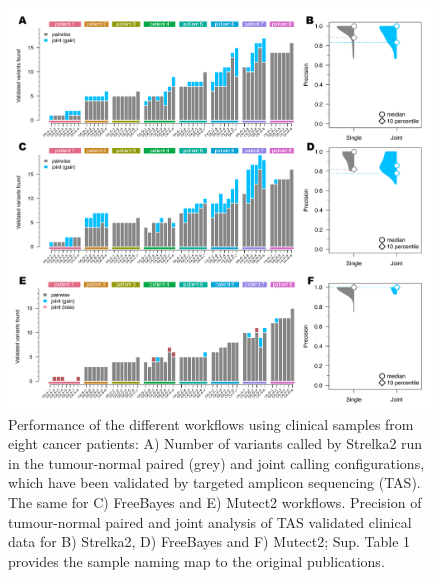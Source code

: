 \begin{figure}[!ht]
\centering
  \includegraphics[width=\textwidth]{Appendices/Variantcalling/supp/S8}
  \caption[Performance of the different workflows using clinical samples from eight cancer patients]{Performance of the different workflows using clinical samples from eight cancer patients: A) Number of variants called by Strelka2 run in the tumour-normal paired (grey) and joint calling configurations, which have been validated by targeted amplicon sequencing (TAS). The same for C) FreeBayes and E) Mutect2 workflows. Precision of tumour-normal paired and joint analysis of TAS validated clinical data for B) Strelka2, D) FreeBayes and F) Mutect2; Sup. Table 1 provides the sample naming map to the original publications.}\label{A:fig:S08}
\end{figure}

